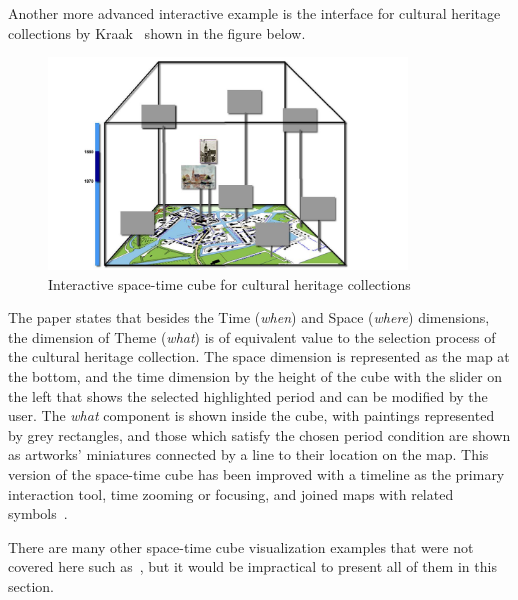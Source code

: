 Another more advanced interactive example is the interface for cultural heritage collections by Kraak~\citep{kraak2005timelines} shown
in the figure below.

\begin{figure}[hbt!]
    \begin{center}
        \includegraphics[width=0.85\textwidth]{graphics/2-literature-review/13}
    \end{center}
    \caption{Interactive space-time cube for cultural heritage collections}
    \label{fig:figure2.13}
\end{figure}

The paper states that besides the Time (\emph{when}) and Space (\emph{where}) dimensions, the dimension of Theme (\emph{what}) is of
equivalent value to the selection process of the cultural heritage collection. The space dimension is represented as the map at the
bottom, and the time dimension by the height of the cube with the slider on the left that shows the selected highlighted period
and can be modified by the user. The \emph{what} component is shown inside the cube, with paintings represented by grey
rectangles, and those which satisfy the chosen period condition are shown as artworks' miniatures connected by a line to their location on the
map. This version of the space-time cube has been improved with a timeline as the primary interaction tool, time zooming or focusing,
and joined maps with related symbols~\citep{amini2014impact}.

There are many other space-time cube visualization examples that were not covered here such as~\citep{kraak2003space, kapler2005geotime,
    andrienko2011identifying, nakaya2010visualising, yusof2016interactive, purwanto2021spatiotemporal, mo2020analysis, sen2022characterisation,
    fang2011constructing, wagner2019evaluating, starek2013space},
but it would be impractical to present all of them in this section.

